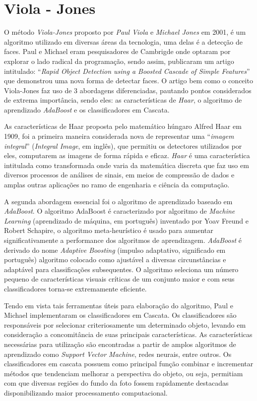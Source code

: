 \documentclass[12pt,a4paper]{article}
\begin{document}
\section{Viola - Jones}
	O método \textit{Viola-Jones} proposto por \textit{Paul Viola} e \textit{Michael Jones} em 2001, é um algoritmo utilizado em diversas áreas da tecnologia, uma delas é a detecção de faces. Paul e Michael eram pesquisadores de Cambrigde onde optaram por explorar o lado radical da programação, sendo assim, publicaram um artigo intitulado: “\textit{Rapid Object Detection using a Boosted Cascade of Simple Features}” que demonstrou uma nova forma de detectar faces. O artigo bem como o conceito Viola-Jones faz uso de 3 abordagens diferenciadas, pautando pontos considerados de extrema importância, sendo eles: as características de \textit{Haar}, o algoritmo de aprendizado \textit{AdaBoost} e os classificadores em Cascata.

	As características de Haar proposta pelo matemático húngaro Alfred Haar em 1909, foi a primeira maneira considerada nova de representar uma “\textit{imagem integral}” (\textit{Integral Image}, em inglês), que permitiu os detectores utilizados por eles, computarem as imagens de forma rápida e eficaz. \textit{Haar} é uma característica intitulada como transformada onde varia da matemática discreta que faz uso em diversos processos de análises de sinais, em meios de compressão de dados e amplas outras aplicações no ramo de engenharia e ciência da computação.


	A segunda abordagem essencial foi o algoritmo de aprendizado baseado em \textit{AdaBoost}. O algoritmo AdaBoost é caracterizado por algoritmo de\textit{ Machine Learning} (aprendizado de máquina, em português) inventado por Yoav Freund e Robert Schapire, o algoritmo meta-heurístico é usado para aumentar significativamente a performance dos algoritmos de aprendizagem. \textit{AdaBoost} é derivado do nome \textit{Adaptive Boosting} (impulso adaptativo, significado em português) algoritmo colocado como ajustável a diversas circunstâncias e adaptável para classificações subsequentes. O algoritmo seleciona um número pequeno de características visuais críticas de um conjunto maior e com seus classificadores torna-se extremamente eficiente.

	Tendo em vista tais ferramentas úteis para elaboração do algoritmo, Paul e Michael implementaram os classificadores em Cascata. Os classificadores são responsáveis por selecionar criteriosamente um determinado objeto, levando em consideração a concomitância de suas principais características. As características necessárias para utilização são encontradas a partir de amplos algoritmos de aprendizado como \textit{Support Vector Machine}, redes neurais, entre outros. Os classificadores em cascata possuem como principal função combinar e incrementar métodos que tendenciam melhorar a perspectiva do objeto, ou seja, permitiam com que diversas regiões do fundo da foto fossem rapidamente destacadas disponibilizando maior processamento computacional.
\end{document}
